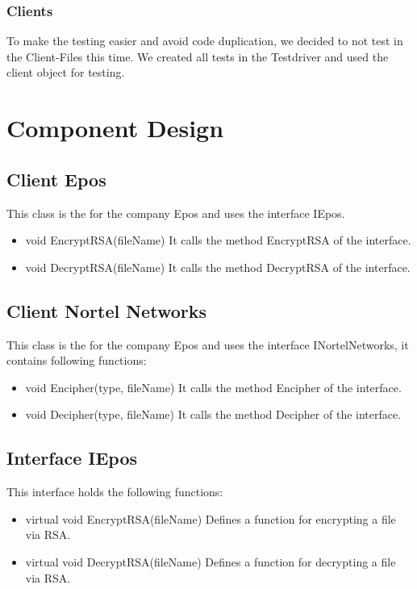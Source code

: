 \subsubsection{Clients}
 To make the testing easier and avoid code duplication, we decided to not test in the Client-Files this time. We created all tests in the Testdriver and used the client object for testing.
	
\section{Component Design}
\subsection{Client Epos}
This class is the for the company Epos and uses the interface IEpos.
\begin{itemize}
\item void EncryptRSA(fileName)
\subitem It calls the method EncryptRSA of the interface.
\item void DecryptRSA(fileName)
\subitem It calls the method DecryptRSA of the interface.
\end{itemize}

\subsection{Client Nortel Networks}
This class is the for the company Epos and uses the interface INortelNetworks, it contains following functions:
\begin{itemize}
\item void Encipher(type, fileName)
\subitem It calls the method Encipher of the interface.
\item void Decipher(type, fileName)
\subitem It calls the method Decipher of the interface.
\end{itemize}

\subsection{Interface IEpos}
This interface holds the following functions:
\begin{itemize}
\item virtual  void EncryptRSA(fileName)
\subitem Defines a function for encrypting a file via RSA.
\item virtual void DecryptRSA(fileName)
\subitem Defines a function for decrypting a file via RSA.
\end{itemize}

